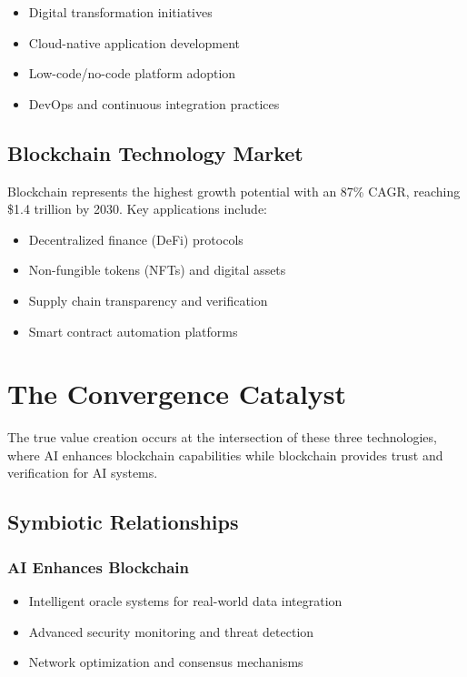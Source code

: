 \documentclass[11pt,a4paper]{report}
\begin{document}
\begin{itemize}
\item Digital transformation initiatives
\item Cloud-native application development
\item Low-code/no-code platform adoption
\item DevOps and continuous integration practices
\end{itemize}

\section{Blockchain Technology Market}

Blockchain represents the highest growth potential with an 87\% CAGR, reaching \$1.4 trillion by 2030. Key applications include:

\begin{itemize}
\item Decentralized finance (DeFi) protocols
\item Non-fungible tokens (NFTs) and digital assets
\item Supply chain transparency and verification
\item Smart contract automation platforms
\end{itemize}

\chapter{The Convergence Catalyst}

The true value creation occurs at the intersection of these three technologies, where AI enhances blockchain capabilities while blockchain provides trust and verification for AI systems.

\section{Symbiotic Relationships}

\subsection{AI Enhances Blockchain}
\begin{itemize}
\item Intelligent oracle systems for real-world data integration
\item Advanced security monitoring and threat detection
\item Network optimization and consensus mechanisms
\end{itemize}
\end{document}
